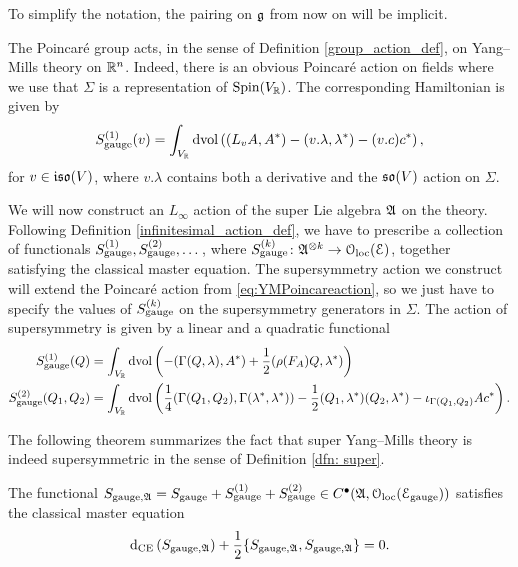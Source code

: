 \documentclass[10pt, oneside]{article}
\begin{document}
To simplify the notation, the pairing on $\mathfrak g$ from now on will be implicit.

The Poincar\'e group acts, in the sense of Definition \ref{group_action_def}, on Yang--Mills theory on $\mathbb R^n$. Indeed, there is an obvious Poincar\'e action on fields where we use that $\Sigma$ is a representation of $\mathrm{Spin}(V_\mathbb R)$. The corresponding Hamiltonian is given by
\begin{equation}
S_{\mathrm{gauge}}^{(1)}(v) = \int_{V_\mathbb R}\operatorname{dvol}\left( (L_{v}A, A^*) - (v.\lambda, \lambda^*) - (v.c)c^*\right),
\label{eq:YMPoincareaction}
\end{equation}
for $v\in\mathfrak{iso}(V)$, where $v.\lambda$ contains both a derivative and the $\mathfrak{so}(V)$ action on $\Sigma$.

We will now construct an $L_\infty$ action of the super Lie algebra $\mathfrak{A}$ on the theory. Following Definition \ref{infinitesimal_action_def}, we have to prescribe a collection of functionals $S_{\mathrm{gauge}}^{(1)}, S_{\mathrm{gauge}}^{(2)}, \dots$, where $S_{\mathrm{gauge}}^{(k)}\colon \mathfrak{A}^{\otimes k}\rightarrow \mathcal{O}_{\rm loc}(\mathcal E)$, together satisfying the classical master equation. The supersymmetry action we construct will extend the Poincar\'{e} action from \eqref{eq:YMPoincareaction}, so we just have to specify the values of $S_{\mathrm{gauge}}^{(k)}$ on the supersymmetry generators in $\Sigma$. The action of supersymmetry is given by a linear and a quadratic functional
\begin{align}
S_{\mathrm{gauge}}^{(1)}(Q) &= \int_{V_\mathbb R}\operatorname{dvol}\left( -(\Gamma(Q, \lambda), A^*) + \frac{1}{2}(\rho(F_A)Q, \lambda^*)\right) \label{eq:gaugeI1} \\
S_{\mathrm{gauge}}^{(2)}(Q_1, Q_2) &= \int_{V_\mathbb R}\operatorname{dvol}\left( \frac{1}{4}(\Gamma(Q_1, Q_2), \Gamma(\lambda^*, \lambda^*)) - \frac{1}{2}(Q_1, \lambda^*)(Q_2, \lambda^*) - \iota_{\Gamma(Q_1, Q_2)} A c^*\right). \label{eq:gaugeI2}
\end{align}

The following theorem summarizes the fact that super Yang--Mills theory is indeed supersymmetric in the sense of Definition \ref{dfn: super}. 

\begin{theorem}\label{thm:gaugemultipletSUSY}
The functional $S_{\mathrm{gauge}, \mathfrak A} = S_{\mathrm{gauge}} + S_{\mathrm{gauge}}^{(1)} + S_{\mathrm{gauge}}^{(2)} \in C^\bullet(\mathfrak{A}, \mathcal{O}_{\rm loc}(\mathcal E_{\mathrm{gauge}}))$ satisfies the classical master equation
\[{\rm d}_{\mathrm{CE}} \left(S_{\mathrm{gauge}, \mathfrak A}\right) + \frac{1}{2}\{S_{\mathrm{gauge}, \mathfrak A}, S_{\mathrm{gauge}, \mathfrak A}\} = 0.\]
\end{theorem}
\end{document}

